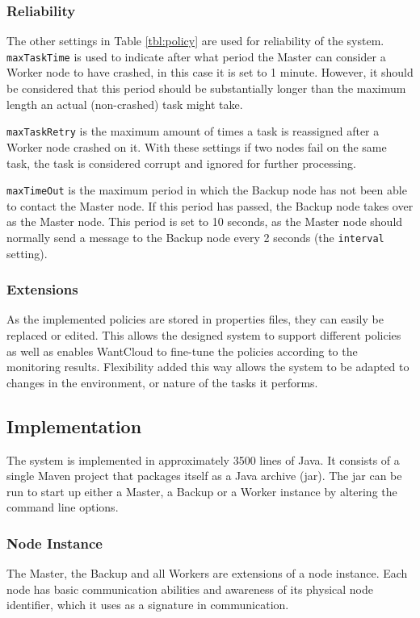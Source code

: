 \documentclass{acm_proc_article-sp}
\begin{document}
\subsubsection{Reliability}
The other settings in Table \ref{tbl:policy} are used for reliability of the system.
\texttt{maxTaskTime} is used to indicate after what period the Master can consider a Worker node to have crashed, in this case it is set to 1 minute.
However, it should be considered that this period should be substantially longer than the maximum length an actual (non-crashed) task might take.

\texttt{maxTaskRetry} is the maximum amount of times a task is reassigned after a Worker node crashed on it.
With these settings if two nodes fail on the same task, the task is considered corrupt and ignored for further processing.

\texttt{maxTimeOut} is the maximum period in which the Backup node has not been able to contact the Master node.
If this period has passed, the Backup node takes over as the Master node.
This period is set to 10 seconds, as the Master node should normally send a message to the Backup node every 2 seconds (the \texttt{interval} setting).

\subsubsection{Extensions}
As the implemented policies are stored in properties files, they can easily be replaced or edited.
This allows the designed system to support different policies as well as enables WantCloud to fine-tune the policies according to the monitoring results.
Flexibility added this way allows the system to be adapted to changes in the environment, or nature of the tasks it performs.

\subsection{Implementation}
The system is implemented in approximately 3500 lines of Java. 
It consists of a single Maven\cite{web:maven} project that packages itself as a Java archive (jar). 
The jar can be run to start up either a Master, a Backup or a Worker instance by altering the command line options.

\subsubsection{Node Instance}
The Master, the Backup and all Workers are extensions of a node instance.  
Each node has basic communication abilities and awareness of its physical node identifier, which it uses as a signature in communication. 
\end{document}
